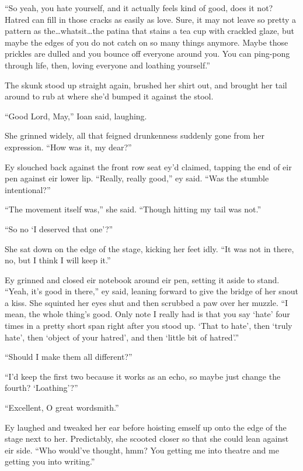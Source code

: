``So yeah, you hate yourself, and it actually feels kind of good, does it not? Hatred can fill in those cracks as easily as love. Sure, it may not leave so pretty a pattern as the\ldots whatsit\ldots the patina that stains a tea cup with crackled glaze, but maybe the edges of you do not catch on so many things anymore. Maybe those prickles are dulled and you bounce off everyone around you. You can ping-pong through life, then, loving everyone and loathing yourself.''

The skunk stood up straight again, brushed her shirt out, and brought her tail around to rub at where she'd bumped it against the stool.

``Good Lord, May,'' Ioan said, laughing.

She grinned widely, all that feigned drunkenness suddenly gone from her expression. ``How was it, my dear?''

Ey slouched back against the front row seat ey'd claimed, tapping the end of eir pen against eir lower lip. ``Really, really good,'' ey said. ``Was the stumble intentional?''

``The movement itself was,'' she said. ``Though hitting my tail was not.''

``So no `I deserved that one'?''

She sat down on the edge of the stage, kicking her feet idly. ``It was not in there, no, but I think I will keep it.''

Ey grinned and closed eir notebook around eir pen, setting it aside to stand. ``Yeah, it's good in there,'' ey said, leaning forward to give the bridge of her snout a kiss. She squinted her eyes shut and then scrubbed a paw over her muzzle. ``I mean, the whole thing's good. Only note I really had is that you say `hate' four times in a pretty short span right after you stood up. `That to hate', then `truly hate', then `object of your hatred', and then `little bit of hatred'.''

``Should I make them all different?''

``I'd keep the first two because it works as an echo, so maybe just change the fourth? `Loathing'?''

``Excellent, O great wordsmith.''

Ey laughed and tweaked her ear before hoisting emself up onto the edge of the stage next to her. Predictably, she scooted closer so that she could lean against eir side. ``Who would've thought, hmm? You getting me into theatre and me getting you into writing.''

